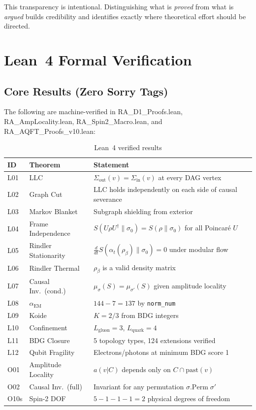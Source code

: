 \documentclass[12pt,a4paper]{article}
\begin{document}
This transparency is intentional.  Distinguishing what is \emph{proved} from what is \emph{argued} builds credibility and identifies exactly where theoretical effort should be directed.

\section{Lean~4 Formal Verification}

\subsection{Core Results (Zero Sorry Tags)}

The following are machine-verified in RA\_D1\_Proofs.lean, RA\_AmpLocality.lean, RA\_Spin2\_Macro.lean, and RA\_AQFT\_Proofs\_v10.lean:

\begin{table}[h]
\centering
\caption{Lean~4 verified results}
\label{tab:lean}
\begin{tabular}{llp{7cm}}
\toprule
ID & Theorem & Statement \\
\midrule
L01 & LLC & $\Sigma_{\mathrm{out}}(v)=\Sigma_{\mathrm{in}}(v)$ at every DAG vertex \\
L02 & Graph Cut & LLC holds independently on each side of causal severance \\
L03 & Markov Blanket & Subgraph shielding from exterior \\
L04 & Frame Independence & $S(U\rho U^\dagger\|\sigma_0)=S(\rho\|\sigma_0)$ for all Poincar\'e $U$ \\
L05 & Rindler Stationarity & $\frac{d}{dt}S(\alpha_t(\rho_\beta)\|\sigma_0)=0$ under modular flow \\
L06 & Rindler Thermal & $\rho_\beta$ is a valid density matrix \\
L07 & Causal Inv.\ (cond.) & $\mu_\sigma(S)=\mu_{\sigma'}(S)$ given amplitude locality \\
L08 & $\alpha_{\mathrm{EM}}$ & $144-7=137$ by \texttt{norm\_num} \\
L09 & Koide & $K=2/3$ from BDG integers \\
L10 & Confinement & $L_{\text{gluon}}=3$, $L_{\text{quark}}=4$ \\
L11 & BDG Closure & 5 topology types, 124 extensions verified \\
L12 & Qubit Fragility & Electrons/photons at minimum BDG score 1 \\
O01 & Amplitude Locality & $a(v|C)$ depends only on $C\cap\mathrm{past}(v)$ \\
O02 & Causal Inv.\ (full) & Invariant for any permutation $\sigma.\mathrm{Perm}\;\sigma'$ \\
O10s & Spin-2 DOF & $5-1-1-1=2$ physical degrees of freedom \\
\bottomrule
\end{tabular}
\end{table}
\end{document}
